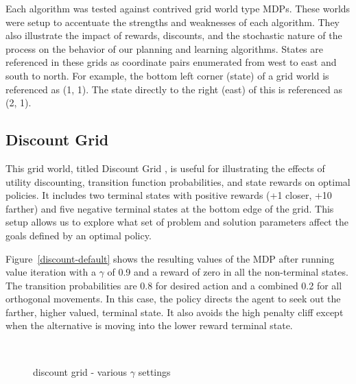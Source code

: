 \documentclass{sig-alternate}
\begin{document}
Each algorithm was tested against contrived grid world type MDPs. These worlds were setup to accentuate the strengths and weaknesses of each algorithm. They also illustrate the impact of rewards, discounts, and the stochastic nature of the process on the behavior of our planning and learning algorithms. States are referenced in these grids as coordinate pairs enumerated from west to east and south to north. For example, the bottom left corner (state) of a grid world is referenced as (1, 1). The state directly to the right (east) of this is referenced as (2, 1).


\subsection{Discount Grid}

This grid world, titled Discount Grid \cite{project3}, is useful for illustrating the effects of utility discounting, transition function probabilities, and state rewards on optimal policies. It includes two terminal states with positive rewards (+1 closer, +10 farther) and five negative terminal states at the bottom edge of the grid. This setup allows us to explore what set of problem and solution parameters affect the goals defined by an optimal policy.

Figure~\ref{discount-default} shows the resulting values of the MDP after running value iteration with a $\gamma$ of 0.9 and a reward of zero in all the non-terminal states. The transition probabilities are 0.8 for desired action and a combined 0.2 for all orthogonal movements. In this case, the policy directs the agent to seek out the farther, higher valued, terminal state. It also avoids the high penalty cliff except when the alternative is moving into the lower reward terminal state.

\begin{figure}[!htbp]
    \centering
    ~
    \caption{discount grid - various $\gamma$ settings}
\end{figure} 
\end{document}
